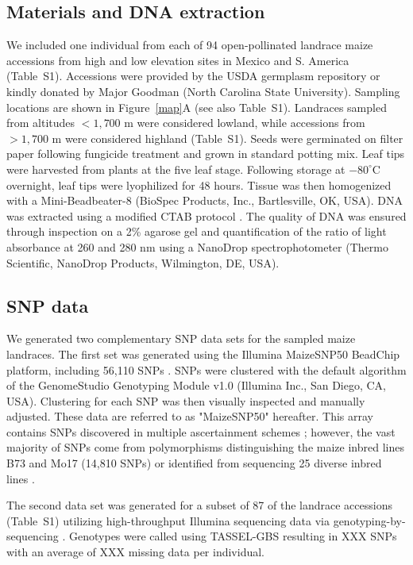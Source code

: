 \subsection*{Materials and DNA extraction}
We included one individual from each of 94 open-pollinated landrace maize accessions from high and low elevation sites in Mexico and S. America (Table~S1).   
Accessions were provided by the USDA germplasm repository or kindly donated by Major Goodman (North Carolina State University).  
Sampling locations are shown in Figure~\ref{map}A (see also Table~S1).   
Landraces sampled from altitudes $<1,700$ m were considered lowland, while accessions from $>1,700$ m were considered highland (Table~S1).   
Seeds were germinated on filter paper following fungicide treatment and grown in standard potting mix.  
Leaf tips were harvested from plants at the five leaf stage.  
Following storage at $-80^{\circ}$C overnight, leaf tips were lyophilized for 48 hours.  
Tissue was then homogenized with a Mini-Beadbeater-8 (BioSpec Products, Inc., Bartlesville, OK, USA).  
DNA was extracted using a modified CTAB protocol \cite[]{CTAB}.  
The quality of DNA was ensured through inspection on a 2\% agarose gel and quantification of the ratio of light absorbance at 260 and 280 nm using a NanoDrop spectrophotometer (Thermo Scientific, NanoDrop Products, Wilmington, DE, USA).

\subsection*{SNP data}
We generated two complementary SNP data sets for the sampled maize landraces. 
The first set was generated using the Illumina MaizeSNP50 BeadChip platform, including 56,110 SNPs \cite[]{Ganal_2011_22174790}.  
SNPs were clustered with the default algorithm of the GenomeStudio Genotyping Module v1.0 (Illumina Inc., San Diego, CA, USA).   
Clustering for each SNP was then visually inspected and manually adjusted.  
These data are referred to as "MaizeSNP50" hereafter.  
This array contains SNPs discovered in multiple ascertainment schemes \cite[]{Ganal_2011_22174790}; however, the vast majority of SNPs come from polymorphisms distinguishing the maize inbred lines B73 and Mo17 (14,810 SNPs) or identified from sequencing 25 diverse inbred lines \cite[40,594 SNPs;][]{Gore20112009}.  

The second data set was generated for a subset of 87 of the landrace accessions (Table~S1)   utilizing high-throughput Illumina sequencing data via genotyping-by-sequencing \cite[GBS;][]{Elshire2011}.
Genotypes were called using TASSEL-GBS \cite[]{Glaubitz_GBS} resulting in {\color{red} XXX} SNPs with an average of  {\color{red} XXX}  missing data per individual.


